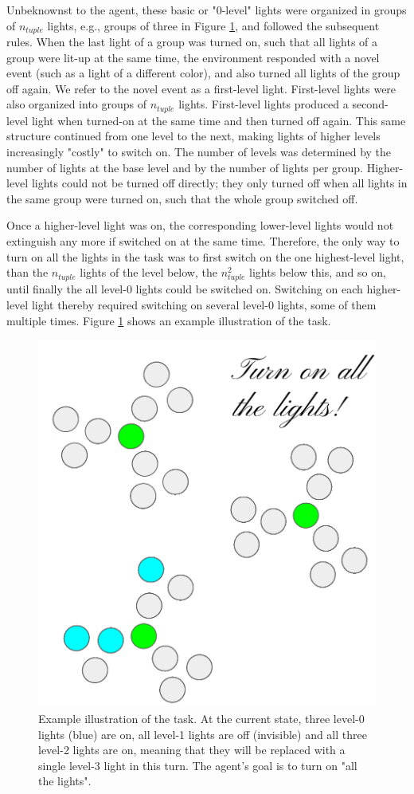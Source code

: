 \documentclass{article}
\begin{document}
Unbeknownst to the agent, these basic or "0-level" lights were organized in groups of $n_{tuple}$ lights, e.g., groups of three in Figure \ref{TaskFigure}, and followed the subsequent rules. When the last light of a group was turned on, such that all lights of a group were lit-up at the same time, the environment responded with a novel event (such as a light of a different color), and also turned all lights of the group off again. We refer to the novel event as a first-level light. First-level lights were also organized into groups of $n_{tuple}$ lights. First-level lights produced a second-level light when turned-on at the same time and then turned off again. This same structure continued from one level to the next, making lights of higher levels increasingly "costly" to switch on. The number of levels was determined by the number of lights at the base level and by the number of lights per group. Higher-level lights could not be turned off directly; they only turned off when all lights in the same group were turned on, such that the whole group switched off.

Once a higher-level light was on, the corresponding lower-level lights would not extinguish any more if switched on at the same time. Therefore, the only way to turn on all the lights in the task was to first switch on the one highest-level light, than the $n_{tuple}$ lights of the level below, the $n_{tuple} ^ 2$ lights below this, and so on, until finally the all level-0 lights could be switched on. Switching on each higher-level light thereby required switching on several level-0 lights, some of them multiple times. Figure \ref{TaskFigure} shows an example illustration of the task.

\begin{figure}[h]
  \centering
  \includegraphics[width=0.5\linewidth]{NIPSfigures/Task.png}
  \caption{Example illustration of the task. At the current state, three level-0 lights (blue) are on, all level-1 lights are off (invisible) and all three level-2 lights are on, meaning that they will be replaced with a single level-3 light in this turn. The agent's goal is to turn on "all the lights".}
  \label{TaskFigure}
\end{figure}
\end{document}
